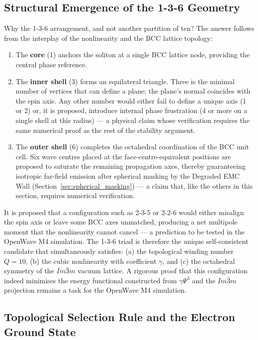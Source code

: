 \documentclass[10pt,a4paper]{article}
\begin{document}
\subsection{Structural Emergence of the 1-3-6 Geometry}

Why the 1-3-6 arrangement, and not another partition of ten?  The answer
follows from the interplay of the nonlinearity and the BCC lattice topology:

\begin{enumerate}
	\item The \textbf{core} (1) anchors the soliton at a single BCC lattice node,
	providing the central phase reference.
	\item The \textbf{inner shell} (3) forms an equilateral triangle.  Three is the
	minimal number of vertices that can define a plane; the plane's normal
	coincides with the spin axis.  Any other number would either fail to define
	a unique axis (1 or 2) or, it is proposed, introduce internal phase frustration
	(4 or more on a single shell at this radius) --- a physical claim whose
	verification requires the same numerical proof as the rest of the stability
	argument.
	\item The \textbf{outer shell} (6) completes the octahedral coordination of the
	BCC unit cell.  Six wave centres placed at the face-centre-equivalent
	positions are proposed to saturate the remaining propagation axes, thereby
	guaranteeing isotropic far-field emission after spherical masking by the
	Degraded EMC Wall (Section~\ref{sec:spherical_masking}) --- a claim that,
	like the others in this section, requires numerical verification.
\end{enumerate}

It is proposed that a configuration such as 2-3-5 or 2-2-6 would either
misalign the spin axis or leave some BCC axes unmatched, producing a net
multipole moment that the nonlinearity cannot cancel --- a prediction to be
tested in the OpenWave M4 simulation.  The 1-3-6 triad is therefore the
unique self-consistent candidate that simultaneously satisfies:
(a) the topological winding number $Q=10$,
(b) the cubic nonlinearity with coefficient $\gamma$, and
(c) the octahedral symmetry of the $Im\bar{3}m$ vacuum lattice.
A rigorous proof that this configuration indeed minimises the energy
functional constructed from $\gamma\Psi^{3}$ and the $Im\bar{3}m$ projection
remains a task for the OpenWave M4 simulation.

\subsection{Topological Selection Rule and the Electron Ground State}
\end{document}
